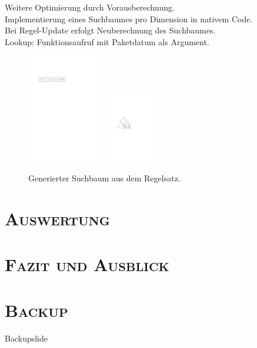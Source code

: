 \documentclass[xcolor=x11names,compress]{beamer}
\renewcommand{\(}{\begin{columns}}
\renewcommand{\)}{\end{columns}}
\newcommand{\<}[1]{\begin{column}{#1}}
\renewcommand{\>}{\end{column}}
\begin{document}
\begin{frame}
  \begin{tcolorbox}[colback=green!5!white,colframe=green!75!black,title=Idee,drop fuzzy shadow]
  Weitere Optimierung durch Vorausberechnung.\\
  \pause
  Implementierung eines Suchbaumes pro Dimension in nativem Code.\\
  Bei Regel-Update erfolgt Neuberechnung des Suchbaumes.\\
  Lookup: Funktionsaufruf mit Paketdatum als Argument.
  \end{tcolorbox}
\end{frame}

\begin{frame}
  \begin{figure}
  \centering
  \includegraphics[width=0.3\textwidth]{figures/array}
  \vfill
  \includegraphics[height=3cm]{figures/bv-tree-simple}
  \caption{Generierter Suchbaum aus dem Regelsatz.}
  \end{figure}
\end{frame}

\section{\scshape Auswertung}
\begin{frame}
\end{frame}

\section{\scshape Fazit und Ausblick}
\begin{frame}
\end{frame}

\appendix
\section{\scshape Backup}
\begin{frame}[noframenumbering]
Backupslide
\end{frame}
\end{document}
